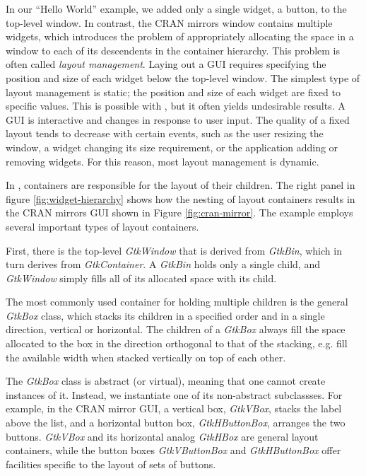 \documentclass[article]{jss}
\begin{document}
In our ``Hello World'' example, we added only a single widget, a
button, to the  top-level window. In contrast, the CRAN mirrors window contains multiple widgets, which introduces the problem of appropriately allocating the space in a window to each of its descendents in the container hierarchy. This problem is often called
\emph{layout management}. Laying out a GUI requires specifying the position and size of each widget below the top-level window. The simplest type of layout management is static; the position and size of each widget are fixed to specific values. This is possible
with , but it often yields undesirable results. A GUI is
interactive and changes in response to user input. The quality of a fixed layout tends to decrease with certain events, such as the user resizing the window, a widget changing its size requirement, or the application adding or removing widgets. For this reason, most layout management is dynamic.

In , containers are responsible for the layout of their
children. The right panel in figure \ref{fig:widget-hierarchy} shows
how the nesting of layout containers results in the CRAN mirrors GUI
shown in Figure \ref{fig:cran-mirror}. The example employs several
important types of  layout containers. 

First, there is the
top-level \emph{GtkWindow} that is derived from \emph{GtkBin}, which
in turn derives from \emph{GtkContainer}.  A \emph{GtkBin} holds only
a single child, and \emph{GtkWindow} simply fills all of its allocated
space with its child. 

The most commonly used container for holding
multiple children is the general \emph{GtkBox} class, which stacks its
children in a specified order and in a single direction, vertical or
horizontal. The children of a \emph{GtkBox} always fill the space
allocated to the box in the direction orthogonal to that of the
stacking, e.g. fill the available width when stacked vertically on top
of each other. 

The \emph{GtkBox} class is abstract (or virtual), meaning
that one cannot create instances of it. Instead, we instantiate one of
its non-abstract subclassses.  For example, in the CRAN mirror GUI, a
vertical box, \emph{GtkVBox}, stacks the label above the list, and a
horizontal button box, \emph{GtkHButtonBox}, arranges the two
buttons. \emph{GtkVBox} and its horizontal analog \emph{GtkHBox} are
general
layout containers, while the button boxes \emph{GtkVButtonBox}
and \emph{GtkHButtonBox} offer facilities specific to the layout of
sets of buttons.
\end{document}
